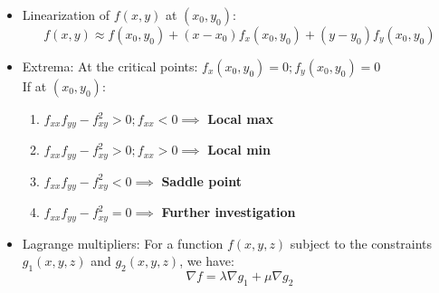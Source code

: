 \documentclass[a4paper]{article}
\begin{document}
\begin{itemize}
    \item Linearization of $f(x,y)$ at $(x_0,y_0)$:\\
    \begin{equation*}
        f(x,y) \approx f(x_0,y_0) + (x-x_0)f_x(x_0,y_0)+(y-y_0)f_y(x_0,y_0)
    \end{equation*}
    \item Extrema: At the critical points: $f_x(x_0,y_0) = 0; f_y(x_0,y_0) = 0$\\
    If at $(x_0,y_0)$:
    \begin{enumerate}
        \item $f_{xx}f_{yy}-f_{xy}^2 > 0; f_{xx}<0 \implies$ \textbf{Local max} \item $f_{xx}f_{yy}-f_{xy}^2 > 0; f_{xx}>0 \implies$ \textbf{Local min}
        \item $f_{xx}f_{yy}-f_{xy}^2 < 0 \implies$ \textbf{Saddle point}
        \item $f_{xx}f_{yy}-f_{xy}^2 = 0 \implies$ \textbf{Further investigation}
    \end{enumerate}
    
    \item Lagrange multipliers: For a function $f(x,y,z)$ subject to the constraints $g_1(x,y,z)$ and $g_2(x,y,z)$, we have:
    \begin{equation*}
        \nabla f = \lambda\nabla g_1 + \mu\nabla g_2
    \end{equation*}
\end{itemize}
\end{document}
